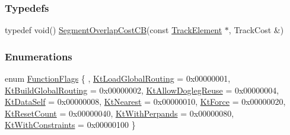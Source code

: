 \subsubsection*{Typedefs}
\begin{DoxyCompactItemize}
\item 
typedef void() \mbox{\hyperlink{namespaceKite_ac86883c8d5a0f34ab9b4ec6eaaad6c9f}{Segment\+Overlap\+Cost\+CB}}(const \mbox{\hyperlink{classKite_1_1TrackElement}{Track\+Element}} $\ast$, Track\+Cost \&)
\end{DoxyCompactItemize}
\subsubsection*{Enumerations}
\begin{DoxyCompactItemize}
\item 
enum \mbox{\hyperlink{namespaceKite_acca8fffa3182dea5f94208f454f14b47}{Function\+Flags}} \{ , \newline
\mbox{\hyperlink{namespaceKite_acca8fffa3182dea5f94208f454f14b47abd49be7700e04e255b30a6cee68535fd}{Kt\+Load\+Global\+Routing}} = 0x00000001, 
\newline
\mbox{\hyperlink{namespaceKite_acca8fffa3182dea5f94208f454f14b47a0441a09d569a7634f9d1826fa315ddcc}{Kt\+Build\+Global\+Routing}} = 0x00000002, 
\newline
\mbox{\hyperlink{namespaceKite_acca8fffa3182dea5f94208f454f14b47a766f453d6caa06490196a952762f0bb8}{Kt\+Allow\+Dogleg\+Reuse}} = 0x00000004, 
\newline
\mbox{\hyperlink{namespaceKite_acca8fffa3182dea5f94208f454f14b47a68e917ff37d4b5cef906303181836404}{Kt\+Data\+Self}} = 0x00000008, 
\newline
\mbox{\hyperlink{namespaceKite_acca8fffa3182dea5f94208f454f14b47afaf04b2ddbae58557683c20373c0bada}{Kt\+Nearest}} = 0x00000010, 
\newline
\mbox{\hyperlink{namespaceKite_acca8fffa3182dea5f94208f454f14b47a5d7da665ec1368b29ee9d3e382cd1072}{Kt\+Force}} = 0x00000020, 
\newline
\mbox{\hyperlink{namespaceKite_acca8fffa3182dea5f94208f454f14b47aeb3b2254e460ac48ce9a57965ba3627b}{Kt\+Reset\+Count}} = 0x00000040, 
\newline
\mbox{\hyperlink{namespaceKite_acca8fffa3182dea5f94208f454f14b47a8f9c41816abe8ac1da87d930bc12ed5e}{Kt\+With\+Perpands}} = 0x00000080, 
\newline
\mbox{\hyperlink{namespaceKite_acca8fffa3182dea5f94208f454f14b47abffa3499a9376f3e9f1de1ab6b8ba37b}{Kt\+With\+Constraints}} = 0x00000100
 \}
\end{DoxyCompactItemize}


